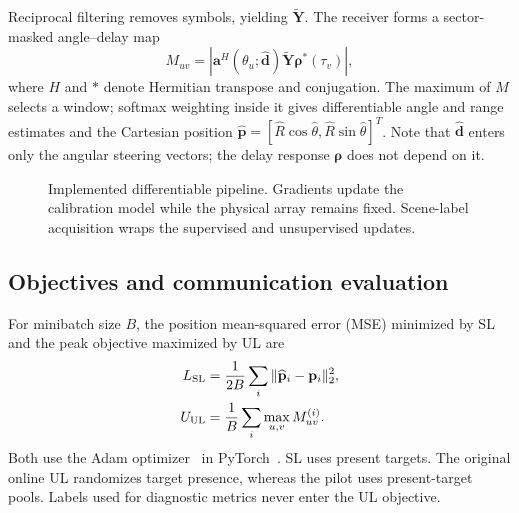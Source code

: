 \documentclass[conference]{IEEEtran}
\begin{document}
Reciprocal filtering removes symbols, yielding $\widetilde{\mathbf Y}$. The receiver forms a sector-masked angle--delay map
\begin{equation}
 M_{uv}=\left|\mathbf a^H(\theta_u;\widehat{\mathbf d})
       \widetilde{\mathbf Y}\bm\rho^*(\tau_v)\right|,
\end{equation}
where $H$ and $*$ denote Hermitian transpose and conjugation. The maximum of $M$ selects a window; softmax weighting inside it gives differentiable angle and range estimates and the Cartesian position $\widehat{\mathbf p}=[\widehat R\cos\widehat\theta,\widehat R\sin\widehat\theta]^T$. Note that $\widehat{\mathbf d}$ enters only the angular steering vectors; the delay response $\bm\rho$ does not depend on it.
\begin{figure}[t]\centering
{}
\caption{Implemented differentiable pipeline. Gradients update the calibration model while the physical array remains fixed. Scene-label acquisition wraps the supervised and unsupervised updates.}
\label{fig:architecture}
\end{figure}
\subsection{Objectives and communication evaluation}
For minibatch size $B$, the position mean-squared error (MSE) minimized by SL and the peak objective maximized by UL are
\begin{align}
 L_{\rm SL}&=\frac{1}{2B}\sum_i\|\widehat{\mathbf p}_i-\mathbf p_i\|_2^2,\\
 U_{\rm UL}&=\frac1B\sum_i\max_{u,v}M^{(i)}_{uv}.
\end{align}
Both use the Adam optimizer~\cite{adam} in PyTorch~\cite{pytorch}. SL uses present targets. The original online UL randomizes target presence, whereas the pilot uses present-target pools. Labels used for diagnostic metrics never enter the UL objective.
\end{document}

